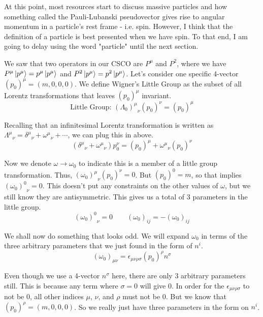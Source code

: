 \documentclass[12pt]{article}
\begin{document}
At this point, most resources start to discuss massive particles and how something called the Pauli-Lubanski pseudovector gives rise to angular momentum in a particle's rest frame - i.e. spin. However, I think that the definition of a particle is best presented when we have spin. To that end, I am going to delay using the word "particle" until the next section.

We saw that two operators in our CSCO are $P^\mu$ and $P^2$, where we have $P^\mu\ket{p^\mu}=p^\mu\ket{p^\mu}$ and $P^2\ket{p^\mu}=p^2\ket{p^\mu}$. Let's consider one specific 4-vector $(p_0)^\mu=(m,0,0,0)$. We define Wigner's Little Group as the subset of all Lorentz transformations that leaves $(p_0)^\mu$ invariant.
\begin{equation}
    \text{Little Group: }{(\Lambda_0)^\mu}_\nu (p_0)^\nu=(p_0)^\mu
\end{equation}

Recalling that an infinitesimal Lorentz transformation is written as ${\Lambda^\mu}_\nu={\delta^\mu}_\nu+{\omega^\mu}_\nu+\cdots$, we can plug this in above.
\begin{equation}
    ({\delta^\mu}_\nu+{\omega^\mu}_\nu) p_0^\nu=(p_0)^\mu+{\omega^\mu}_\nu (p_0)^\nu
\end{equation}

Now we denote $\omega\rightarrow\omega_0$ to indicate this is a member of a little group transformation. Thus, ${(\omega_0)^\mu}_\nu (p_0)^\nu=0$. But $(p_0)^0=m$, so that implies ${(\omega_0)^0}_\nu=0$. This doesn't put any constraints on the other values of $\omega$, but we still know they are antisymmetric. This gives us a total of 3 parameters in the little group.
\begin{equation}
    {(\omega_0)^0}_\nu=0\qquad(\omega_0)_{ij}=-(\omega_0)_{ij}
\end{equation}

We shall now do something that looks odd. We will expand $\omega_0$ in terms of the three arbitrary parameters that we just found in the form of $n^i$. 
\begin{equation}
    (\omega_0)_{\mu\nu}=\epsilon_{\mu\nu\rho\sigma}(p_0)^\rho n^\sigma
\end{equation}

Even though we use a 4-vector $n^\sigma$ here, there are only 3 arbitrary parameters still. This is because any term where $\sigma=0$ will give $0$. In order for the $\epsilon_{\mu\nu\rho\sigma}$ to not be $0$, all other indices $\mu$, $\nu$, and $\rho$ must not be $0$. But we know that $(p_0)^\rho=(m,0,0,0)$. So we really just have three parameters in the form on $n^i$.
\end{document}
